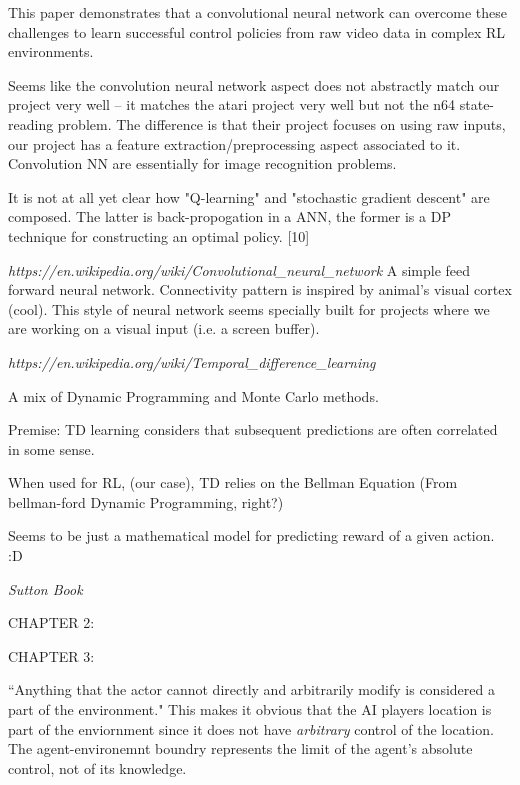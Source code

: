 This paper demonstrates that a convolutional neural network can overcome these challenges to learn successful control policies from raw video data in complex RL environments.

Seems like the convolution neural network aspect does not abstractly match our project very well -- it matches the atari project very well but not the n64 state-reading problem.
The difference is that their project focuses on using raw inputs, our project has a feature extraction/preprocessing aspect associated to it.
Convolution NN are essentially for image recognition problems.

It is not at all yet clear how "Q-learning" and "stochastic gradient descent" are composed.
The latter is back-propogation in a ANN, the former is a DP technique for constructing an optimal policy.
[10]


\textit{https://en.wikipedia.org/wiki/Convolutional_neural_network}
A simple feed forward neural network.
Connectivity pattern is inspired by animal's visual cortex (cool).
This style of neural network seems specially built for projects where we are working on a visual input (i.e. a screen buffer).

\textit{https://en.wikipedia.org/wiki/Temporal_difference_learning}

A mix of Dynamic Programming and Monte Carlo methods.

Premise: TD learning considers that subsequent predictions are often correlated in some sense.

When used for RL, (our case), TD relies on the Bellman Equation (From bellman-ford Dynamic Programming, right?)

Seems to be just a mathematical model for predicting reward of a given action. :D


\textit{Sutton Book}

CHAPTER 2:



CHAPTER 3:

``Anything that the actor cannot directly and arbitrarily modify is considered a part of the environment."
This makes it obvious that the AI players location is part of the enviornment since it does not have \textit{arbitrary} control of the location.
The agent-environemnt boundry represents the limit of the agent's absolute control, not of its knowledge.

